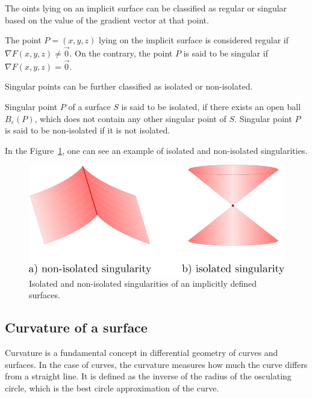 The oints lying on an implicit surface can be classified as regular or
singular based on the value of the gradient vector at that point.

\begin{definition}
    The point $P=(x,y,z)$ lying on the implicit surface is considered regular
    if $\nabla F(x, y, z) \neq \vec{0}$. On the contrary, the point $P$ is said to be 
    singular if $\nabla F(x, y, z) = \vec{0}$.
\end{definition}

Singular points can be further classified as isolated or non-isolated.

\begin{definition}
    Singular point $P$ of a surface $S$ is said to be isolated,
    if there exists an open ball $B_\varepsilon(P)$, which does not 
    contain any other singular point of $S$.
    Singular point $P$ is said to be non-isolated if it is not isolated.
\end{definition}

In the Figure~\ref{img:2}, one can see an example of isolated and non-isolated
singularities.

\begin{figure}
    \centerline{\includegraphics[scale=0.5]{images/img2}}
    \caption[Isolated and non-isolated singularities of an implicitly defined surfaces]
    {Isolated and non-isolated singularities of an implicitly defined surfaces.}
    \label{img:2}
\end{figure}

\subsection{Curvature of a surface}

Curvature is a fundamental concept in differential geometry of curves and surfaces.
In the case of curves, the curvature measures how much the curve differs from a 
straight line. It is defined as the inverse of the radius of the osculating circle,
which is the best circle approximation of the curve.

